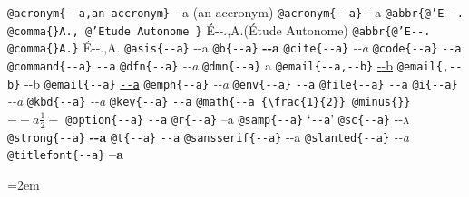 \documentclass{book}
\newcommand\GNUTexinfocommandstylecodetextcite[1]{{\normalfont{}\textsl{#1}}}%
\begin{document}
\texttt{@acronym\{{-}{-}a,an accronym\}} {-}{-}a (an accronym)
\texttt{@acronym\{{-}{-}a\}} {-}{-}a
\texttt{@abbr\{@'E{-}{-}. @comma\{\}A., @'Etude Autonome \}} \'{E}{-}{-}.\@ ,A.\@ (\'{E}tude Autonome)
\texttt{@abbr\{@'E{-}{-}. @comma\{\}A.\}} \'{E}{-}{-}.\@ ,A.\@
\texttt{@asis\{{-}{-}a\}} {-}{-}a
\texttt{@b\{{-}{-}a\}} \textbf{{-}{-}a}
\texttt{@cite\{{-}{-}a\}} \GNUTexinfocommandstylecodetextcite{{-}{-}a}
\texttt{@code\{{-}{-}a\}} \texttt{{-}{-}a}
\texttt{@command\{{-}{-}a\}} \texttt{{-}{-}a}
\texttt{@dfn\{{-}{-}a\}} \textsl{{-}{-}a}
\texttt{@dmn\{{-}{-}a\}} \thinspace {-}{-}a
\texttt{@email\{{-}{-}a,{-}{-}b\}} \href{mailto:--a}{{-}{-}b}
\texttt{@email\{,{-}{-}b\}} {-}{-}b
\texttt{@email\{{-}{-}a\}} \href{mailto:--a}{\nolinkurl{--a}}
\texttt{@emph\{{-}{-}a\}} \emph{{-}{-}a}
\texttt{@env\{{-}{-}a\}} \texttt{{-}{-}a}
\texttt{@file\{{-}{-}a\}} \texttt{{-}{-}a}
\texttt{@i\{{-}{-}a\}} \textit{{-}{-}a}
\texttt{@kbd\{{-}{-}a\}} {\ttfamily\textsl{{-}{-}a}}
\texttt{@key\{{-}{-}a\}} \texttt{{-}{-}a}
\texttt{@math\{{-}{-}a \{\textbackslash{}frac\{1\}\{2\}\} @minus\{\}\}} $--a {\frac{1}{2}} -$
\texttt{@option\{{-}{-}a\}} \texttt{{-}{-}a}
\texttt{@r\{{-}{-}a\}} \textnormal{--a}
\texttt{@samp\{{-}{-}a\}} `\texttt{{-}{-}a}'
\texttt{@sc\{{-}{-}a\}} \textsc{{-}{-}a}
\texttt{@strong\{{-}{-}a\}} \textbf{{-}{-}a}
\texttt{@t\{{-}{-}a\}} \texttt{{-}{-}a}
\texttt{@sansserif\{{-}{-}a\}} \textsf{{-}{-}a}
\texttt{@slanted\{{-}{-}a\}} \textsl{{-}{-}a}
\texttt{@titlefont\{{-}{-}a\}} \endgroup{}%
{\huge \bfseries --a}\par\begingroup\obeylines\obeyspaces\frenchspacing\leftskip=2em \parskip=0pt \parindent=0pt \ttfamily%
\end{document}
